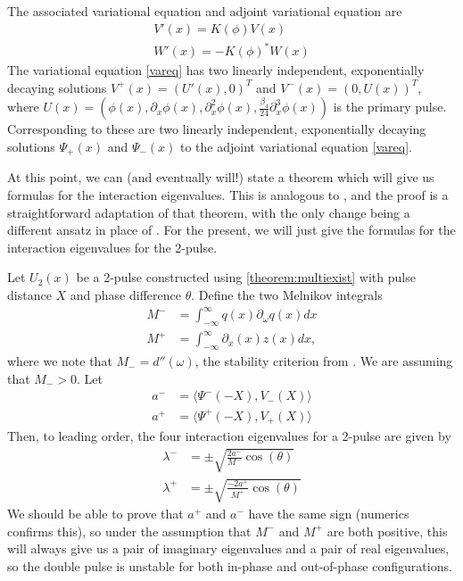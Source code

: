 \documentclass[12pt]{article}
\begin{document}
The associated variational equation and adjoint variational equation are
\begin{align}
V'(x) = K(\phi)V(x) \label{vareq} \\
W'(x) = -K(\phi)^*W(x)\label{adjvareq}
\end{align}
The variational equation \cref{vareq} has two linearly independent, exponentially decaying solutions $V^+(x) = (U'(x), 0)^T$ and $V^-(x) = (0, U(x))^T$, where $U(x) = (\phi(x), \partial_x \phi(x), \partial_x^2 \phi(x), \frac{\beta_4}{24} \partial_x^3 \phi(x))$ is the primary pulse. Corresponding to these are two linearly independent, exponentially decaying solutions $\Psi_+(x)$ and $\Psi_-(x)$ to the adjoint variational equation \cref{vareq}. 

At this point, we can (and eventually will!) state a theorem which will give us formulas for the interaction eigenvalues. This is analogous to \cite[Theorem 2]{Sandstede1998}, and the proof is a straightforward adaptation of that theorem, with the only change being a different ansatz in place of \cite[(3.5)]{Sandstede1998}. For the present, we will just give the formulas for the interaction eigenvalues for the 2-pulse.

Let $U_2(x)$ be a 2-pulse constructed using \cref{theorem:multiexist} with pulse distance $X$ and phase difference $\theta$. Define the two Melnikov integrals
\begin{align*}
M^- &= \int_{-\infty}^\infty q(x) \partial_\omega q(x) dx \\
M^+ &= \int_{-\infty}^\infty \partial_x (x) z(x) dx,
\end{align*}
where we note that $M_- = d''(\omega)$, the stability criterion from \cite{Grillakis1987}. We are assuming that $M_- > 0$. Let 
\begin{align*}
a^- &= \langle \Psi^-(-X), V_-(X) \rangle \\
a^+ &= \langle \Psi^+(-X), V_+(X) \rangle 
\end{align*}
Then, to leading order, the four interaction eigenvalues for a 2-pulse are given by
\begin{equation}\label{inteigpred}
\begin{aligned}
\lambda^- &= \pm \sqrt{ \frac{2 a^-}{M^-} \cos(\theta) }\\
\lambda^+ &= \pm \sqrt{ \frac{-2 a^+}{M^+} \cos(\theta) }
\end{aligned}
\end{equation}
We should be able to prove that $a^+$ and $a^-$ have the same sign (numerics confirms this), so under the assumption that $M^-$ and $M^+$ are both positive, this will always give us a pair of imaginary eigenvalues and a pair of real eigenvalues, so the double pulse is unstable for both in-phase and out-of-phase configurations.
\end{document}
